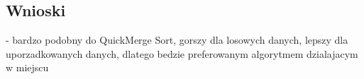 \begin{figure}[]
	\centering
	
	\caption[]{}
	\label{fig:quick-merge-intro-sort-nondeterministic-pivot-density}
\end{figure}

\subsection{Wnioski}
- bardzo podobny do QuickMerge Sort, gorszy dla losowych danych, lepszy dla uporzadkowanych danych, dlatego bedzie preferowanym algorytmem dzialajacym w miejscu